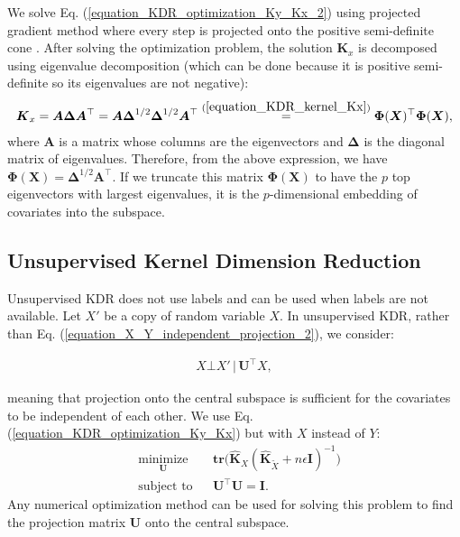 \documentclass[lang=cn,10pt]{gorgeousnbook}
\numberwithin{equation}{section}%
\numberwithin{figure}{section}%
\begin{document}
We solve Eq. (\ref{equation_KDR_optimization_Ky_Kx_2}) using projected gradient method where every step is projected onto the positive semi-definite cone \cite{ghojogh2021kkt}. After solving the optimization problem, the solution $\boldsymbol{K}_x$ is decomposed using eigenvalue decomposition (which can be done because it is positive semi-definite so its eigenvalues are not negative):
\begin{align*}
\boldsymbol{K}_x = \boldsymbol{A} \boldsymbol{\Delta} \boldsymbol{A}^\top = \boldsymbol{A} \boldsymbol{\Delta}^{1/2} \boldsymbol{\Delta}^{1/2} \boldsymbol{A}^\top \overset{(\ref{equation_KDR_kernel_Kx})}{=} \boldsymbol{\Phi}(\boldsymbol{X})^\top \boldsymbol{\Phi}(\boldsymbol{X}),
\end{align*}
where $\boldsymbol{A}$ is a matrix whose columns are the eigenvectors and $\boldsymbol{\Delta}$ is the diagonal matrix of eigenvalues. 
Therefore, from the above expression, we have $\boldsymbol{\Phi}(\boldsymbol{X}) = \boldsymbol{\Delta}^{1/2} \boldsymbol{A}^\top$. If we truncate this matrix $\boldsymbol{\Phi}(\boldsymbol{X})$ to have the $p$ top eigenvectors with largest eigenvalues, it is the $p$-dimensional embedding of covariates into the subspace. 

\subsection{Unsupervised Kernel Dimension Reduction}

Unsupervised KDR \cite{wang2010unsupervised} does not use labels and can be used when labels are not available. 
Let $X'$ be a copy of random variable $X$. In unsupervised KDR, rather than Eq. (\ref{equation_X_Y_independent_projection_2}), we consider:

\begin{align}\label{equation_X_Y_independent_projection_2_unsupervised}
X \bot X'\, |\, \boldsymbol{U}^\top X,
\end{align}

meaning that projection onto the central subspace is sufficient for the covariates to be independent of each other. 
We use Eq. (\ref{equation_KDR_optimization_Ky_Kx}) but with $X$ instead of $Y$:
\begin{equation}\label{equation_KDR_optimization_unsupervised}
\begin{aligned}
& \underset{\boldsymbol{U}}{\text{minimize}} 
& & \textbf{tr}\big(\widehat{\boldsymbol{K}}_X (\widehat{\boldsymbol{K}}_{\widetilde{X}} + n\epsilon \boldsymbol{I})^{-1}\big) \\
& \text{subject to}
& & \boldsymbol{U}^\top \boldsymbol{U} = \boldsymbol{I}.
\end{aligned}
\end{equation}
Any numerical optimization method can be used for solving this problem to find the projection matrix $\boldsymbol{U}$ onto the central subspace. 
\end{document}
